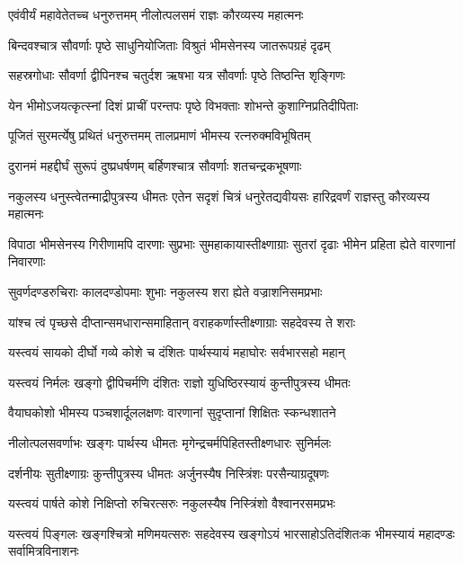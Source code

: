 \twolineshloka
{एवंवीर्यं महावेतेतच्च धनुरुत्तमम्}
{नीलोत्पलसमं राज्ञः कौरव्यस्य महात्मनः}


\twolineshloka
{बिन्दवश्चात्र सौवर्णाः पृष्ठे साधुनियोजिताः}
{विश्रुतं भीमसेनस्य जातरूपग्रहं दृढम्}


\twolineshloka
{सहस्रगोधाः सौवर्णा द्वीपिनश्च चतुर्दश}
{ऋषभा यत्र सौवर्णाः पृष्ठे तिष्ठन्ति शृङ्गिणः}


\twolineshloka
{येन भीमोऽजयत्कृत्स्नां दिशं प्राचीं परन्तपः}
{पृष्ठे विभक्ताः शोभन्ते कुशाग्निप्रतिदीपिताः}


\twolineshloka
{पूजितं सुरमर्त्येषु प्रथितं धनुरुत्तमम्}
{तालप्रमाणं भीमस्य रत्नरुक्मविभूषितम्}


\twolineshloka
{दुरानमं महद्दीर्घं सुरूपं दुष्प्रधर्षणम्}
{बर्हिणश्चात्र सौवर्णाः शतचन्द्रकभूषणाः}


\threelineshloka
{नकुलस्य धनुस्त्वेतन्माद्रीपुत्रस्य धीमतः}
{एतेन सदृशं चित्रं धनुरेतद्यवीयसः}
{हारिद्रवर्णं राज्ञस्तु कौरव्यस्य महात्मनः}


\threelineshloka
{विपाठा भीमसेनस्य गिरीणामपि दारणाः}
{सुप्रभाः सुमहाकायास्तीक्ष्णाग्राः सुतरां दृढाः}
{भीमेन प्रहिता ह्येते वारणानां निवारणाः}


\twolineshloka
{सुवर्णदण्डरुचिराः कालदण्डोपमाः शुभाः}
{नकुलस्य शरा ह्येते वज्राशनिसमप्रभाः}


\twolineshloka
{यांश्च त्वं पृच्छसे दीप्तान्समधारान्समाहितान्}
{वराहकर्णास्तीक्ष्णाग्राः सहदेवस्य ते शराः}


\twolineshloka
{यस्त्वयं सायको दीर्घो गव्ये कोशे च दंशितः}
{पार्थस्यायं महाघोरः सर्वभारसहो महान्}


\twolineshloka
{यस्त्वयं निर्मलः खङ्गो द्वीपिचर्मणि दंशितः}
{राज्ञो युधिष्ठिरस्यायं कुन्तीपुत्रस्य धीमतः}



\twolineshloka
{वैयाघकोशो भीमस्य पञ्चशार्दूललक्षणः}
{वारणानां सुदृप्तानां शिक्षितः स्कन्धशातने}


\twolineshloka
{नीलोत्पलसवर्णाभः खङ्गः पार्थस्य धीमतः}
{मृगेन्द्रचर्मपिहितस्तीक्ष्णधारः सुनिर्मलः}


\twolineshloka
{दर्शनीयः सुतीक्ष्णाग्रः कुन्तीपुत्रस्य धीमतः}
{अर्जुनस्यैष निस्त्रिंशः परसैन्याग्रदूषणः}


\twolineshloka
{यस्त्वयं पार्षते कोशे निक्षिप्तो रुचिरत्सरुः}
{नकुलस्यैष निस्त्रिंशो वैश्वानरसमप्रभः}


\threelineshloka
{यस्त्वयं पिङ्गलः खङ्गश्चित्रो मणिमयत्सरुः}
{सहदेवस्य खङ्गोऽयं भारसाहोऽतिदंशितःक}
{भीमस्यायं महादण्डः सर्वामित्रविनाशनः}



